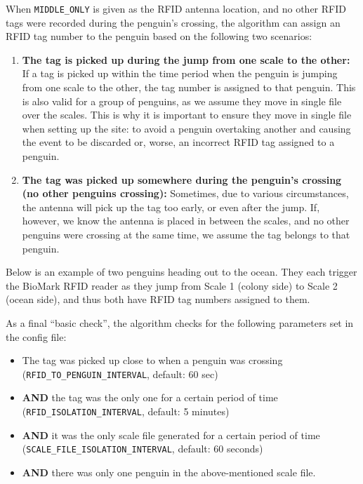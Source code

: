 \documentclass[
  letterpaper,
]{scrbook}
\providecommand{\tightlist}{%
  \setlength{\itemsep}{0pt}\setlength{\parskip}{0pt}}
\begin{document}
When \texttt{\textquotesingle{}MIDDLE\_ONLY\textquotesingle{}} is given
as the RFID antenna location, and no other RFID tags were recorded
during the penguin's crossing, the algorithm can assign an RFID tag
number to the penguin based on the following two scenarios:

\begin{enumerate}
\def\labelenumi{\arabic{enumi}.}
\tightlist
\item
  \textbf{The tag is picked up during the jump from one scale to the
  other:} If a tag is picked up within the time period when the penguin
  is jumping from one scale to the other, the tag number is assigned to
  that penguin. This is also valid for a group of penguins, as we assume
  they move in single file over the scales. This is why it is important
  to ensure they move in single file when setting up the site: to avoid
  a penguin overtaking another and causing the event to be discarded or,
  worse, an incorrect RFID tag assigned to a penguin.
\item
  \textbf{The tag was picked up somewhere during the penguin's crossing
  (no other penguins crossing):} Sometimes, due to various
  circumstances, the antenna will pick up the tag too early, or even
  after the jump. If, however, we know the antenna is placed in between
  the scales, and no other penguins were crossing at the same time, we
  assume the tag belongs to that penguin.
\end{enumerate}

Below is an example of two penguins heading out to the ocean. They each
trigger the BioMark RFID reader as they jump from Scale 1 (colony side)
to Scale 2 (ocean side), and thus both have RFID tag numbers assigned to
them.

As a final ``basic check'', the algorithm checks for the following
parameters set in the config file:

\begin{itemize}
\tightlist
\item
  The tag was picked up close to when a penguin was crossing
  (\texttt{RFID\_TO\_PENGUIN\_INTERVAL}, default: 60 sec)\\
\item
  \textbf{AND} the tag was the only one for a certain period of time
  (\texttt{RFID\_ISOLATION\_INTERVAL}, default: 5 minutes)\\
\item
  \textbf{AND} it was the only scale file generated for a certain period
  of time (\texttt{SCALE\_FILE\_ISOLATION\_INTERVAL}, default: 60
  seconds)\\
\item
  \textbf{AND} there was only one penguin in the above-mentioned scale
  file.
\end{itemize}
\end{document}

